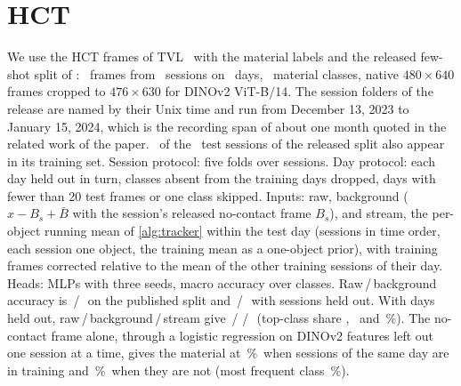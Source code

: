 \documentclass[10pt,twocolumn,letterpaper]{article}
\newcommand{\pct}{\,\%}
\begin{document}
\section{HCT}
We use the HCT frames of TVL~\cite{tvl2024} with the material labels and the released few-shot split of \cite{mohsan2026language}: \HctFrames\ frames from \HctSessions\ sessions on \HctDays\ days, \HctClasses\ material classes, native $480\times640$ frames cropped to $476\times630$ for DINOv2 ViT-B/14. The session folders of the release are named by their Unix time and run from December 13, 2023 to January 15, 2024, which is the recording span of about one month quoted in the related work of the paper. \HctTestSessInTrain\ of the \HctTestSessions\ test sessions of the released split also appear in its training set. Session protocol: five folds over sessions. Day protocol: each day held out in turn, classes absent from the training days dropped, days with fewer than 20 test frames or one class skipped. Inputs: raw, background ($x - B_s + \bar B$ with the session's released no-contact frame $B_s$), and stream, the per-object running mean of \cref{alg:tracker} within the test day (sessions in time order, each session one object, the training mean as a one-object prior), with training frames corrected relative to the mean of the other training sessions of their day. Heads: MLPs with three seeds, macro accuracy over classes. Raw\,/\,background accuracy is \HctPubRawAcc\,/\,\HctPubBgAcc\ on the published split and \HctSessRawAcc\,/\,\HctSessBgAcc\ with sessions held out. With days held out, raw\,/\,background\,/\,stream give \HctDayRawAcc\,/\,\HctDayBgAcc\,/\,\HctDayStreamAcc\ (top-class share \HctDayRawTop, \HctDayBgTop\ and \HctDayStreamTop\pct). The no-contact frame alone, through a logistic regression on DINOv2 features left out one session at a time, gives the material at \HctProbeLoso\pct\ when sessions of the same day are in training and \HctProbeOtherDays\pct\ when they are not (most frequent class \HctProbeMajority\pct).
\end{document}
